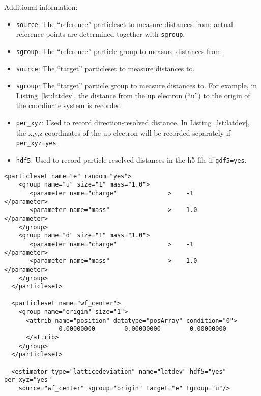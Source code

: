 Additional information:
\begin{itemize}
  \item{\texttt{source}: The ``reference'' particleset to measure distances from; actual reference points are determined together with \verb|sgroup|.}
  \item{\texttt{sgroup}: The ``reference'' particle group to measure distances from.} 
  \item{\texttt{source}: The ``target'' particleset to measure distances to.}
  \item{\texttt{sgroup}: The ``target'' particle group to measure distances to. For example, in Listing~\ref{lst:latdev}, the distance from the up electron (``u'') to the origin of the coordinate system is recorded.}
  \item{\texttt{per\_xyz}: Used to record direction-resolved distance. In Listing~\ref{lst:latdev}, the x,y,z coordinates of the up electron will be recorded separately if \texttt{per\_xyz=yes}.}
  \item{\texttt{hdf5}: Used to record particle-resolved distances in the h5 file if \texttt{gdf5=yes}.}
\end{itemize}

\begin{lstlisting}[style=QMCPXML,caption={Lattice deviation estimator element.},label={lst:latdev}]
  <particleset name="e" random="yes">
    <group name="u" size="1" mass="1.0">
       <parameter name="charge"              >    -1                    </parameter>
       <parameter name="mass"                >    1.0                   </parameter>
    </group>
    <group name="d" size="1" mass="1.0">
       <parameter name="charge"              >    -1                    </parameter>
       <parameter name="mass"                >    1.0                   </parameter>
    </group>
  </particleset>
  
  <particleset name="wf_center">
    <group name="origin" size="1">
      <attrib name="position" datatype="posArray" condition="0">
               0.00000000        0.00000000        0.00000000
      </attrib>
    </group>
  </particleset>
  
  <estimator type="latticedeviation" name="latdev" hdf5="yes" per_xyz="yes"
    source="wf_center" sgroup="origin" target="e" tgroup="u"/>
\end{lstlisting}




